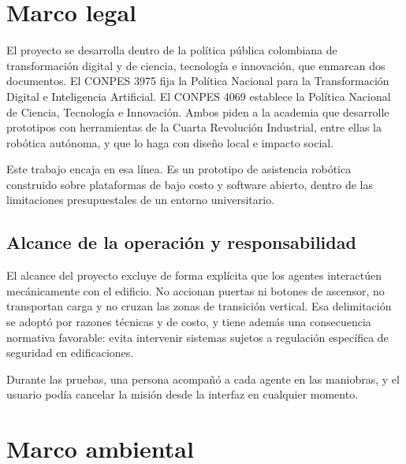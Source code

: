 \section{Marco legal}
\label{sec:legal}

El proyecto se desarrolla dentro de la política pública colombiana de
transformación digital y de ciencia, tecnología e innovación, que enmarcan dos
documentos. El CONPES 3975 \autocite{conpes3975} fija la Política Nacional para la
Transformación Digital e Inteligencia Artificial. El CONPES 4069
\autocite{conpes4069} establece la Política Nacional de Ciencia, Tecnología e
Innovación. Ambos piden a la academia que desarrolle prototipos con herramientas
de la Cuarta Revolución Industrial, entre ellas la robótica autónoma, y que lo
haga con diseño local e impacto social.

Este trabajo encaja en esa línea. Es un prototipo de asistencia robótica
construido sobre plataformas de bajo costo y software abierto, dentro de las
limitaciones presupuestales de un entorno universitario.



\subsection{Alcance de la operación y responsabilidad}

El alcance del proyecto excluye de forma explícita que los agentes interactúen mecánicamente con el edificio. No accionan puertas ni botones de ascensor, no
transportan carga y no cruzan las zonas de transición vertical. Esa delimitación
se adoptó por razones técnicas y de costo, y tiene además una consecuencia
normativa favorable: evita intervenir sistemas sujetos a regulación específica de seguridad en edificaciones.

Durante las pruebas, una persona acompañó a cada agente en las maniobras, y el usuario podía cancelar la misión desde la interfaz en cualquier momento.



\section{Marco ambiental}
\label{sec:ambiental}


